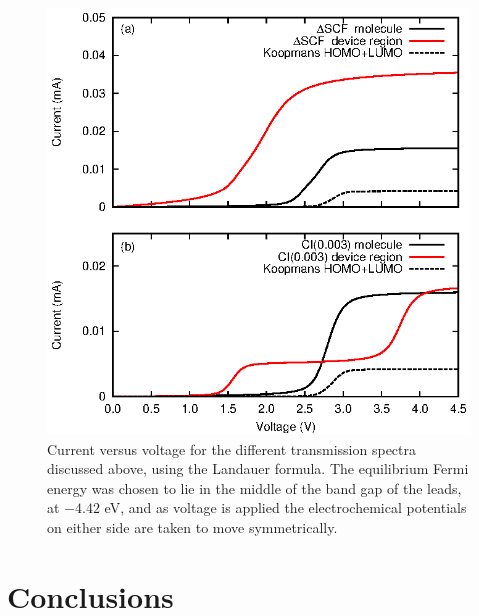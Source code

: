 \begin{figure}
	\begin{center}
		\includegraphics[width=0.9\linewidth]{figures/figure9a_9b}
	\end{center}
	\caption{Current versus voltage for the different transmission
	         spectra discussed above, using the Landauer formula.
		 The equilibrium Fermi
		 energy was chosen to lie in the middle of the band gap
		 of the leads, at $-4.42$ eV, and as voltage is applied
		 the electrochemical potentials on either side are taken
		 to move symmetrically.}
	\label{fig:iv}
\end{figure}
 
\section{Conclusions}
\label{sec:conclusions}

